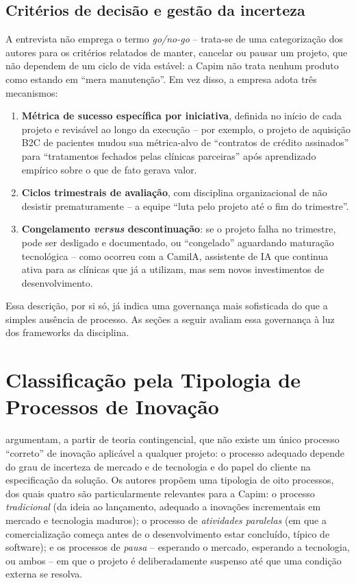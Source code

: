 \subsection{Critérios de decisão e gestão da incerteza}

A entrevista não emprega o termo \textit{go/no-go} -- trata-se de uma categorização dos autores para os critérios relatados de manter, cancelar ou pausar um projeto, que não dependem de um ciclo de vida estável: a Capim não trata nenhum produto como estando em ``mera manutenção''. Em vez disso, a empresa adota três mecanismos:

\begin{enumerate}
  \item \textbf{Métrica de sucesso específica por iniciativa}, definida no início de cada projeto e revisável ao longo da execução -- por exemplo, o projeto de aquisição B2C de pacientes mudou sua métrica-alvo de ``contratos de crédito assinados'' para ``tratamentos fechados pelas clínicas parceiras'' após aprendizado empírico sobre o que de fato gerava valor.
  \item \textbf{Ciclos trimestrais de avaliação}, com disciplina organizacional de não desistir prematuramente -- a equipe ``luta pelo projeto até o fim do trimestre''.
  \item \textbf{Congelamento \textit{versus} descontinuação}: se o projeto falha no trimestre, pode ser desligado e documentado, ou ``congelado'' aguardando maturação tecnológica -- como ocorreu com a CamilA, assistente de IA que continua ativa para as clínicas que já a utilizam, mas sem novos investimentos de desenvolvimento.
\end{enumerate}

Essa descrição, por si só, já indica uma governança mais sofisticada do que a simples ausência de processo. As seções a seguir avaliam essa governança à luz dos frameworks da disciplina.

\section{Classificação pela Tipologia de Processos de Inovação}
\label{sec:tipologia}

\textcite{salerno2015} argumentam, a partir de teoria contingencial, que não existe um único processo ``correto'' de inovação aplicável a qualquer projeto: o processo adequado depende do grau de incerteza de mercado e de tecnologia e do papel do cliente na especificação da solução. Os autores propõem uma tipologia de oito processos, dos quais quatro são particularmente relevantes para a Capim: o processo \textit{tradicional} (da ideia ao lançamento, adequado a inovações incrementais em mercado e tecnologia maduros); o processo de \textit{atividades paralelas} (em que a comercialização começa antes de o desenvolvimento estar concluído, típico de software); e os processos de \textit{pausa} -- esperando o mercado, esperando a tecnologia, ou ambos -- em que o projeto é deliberadamente suspenso até que uma condição externa se resolva.

